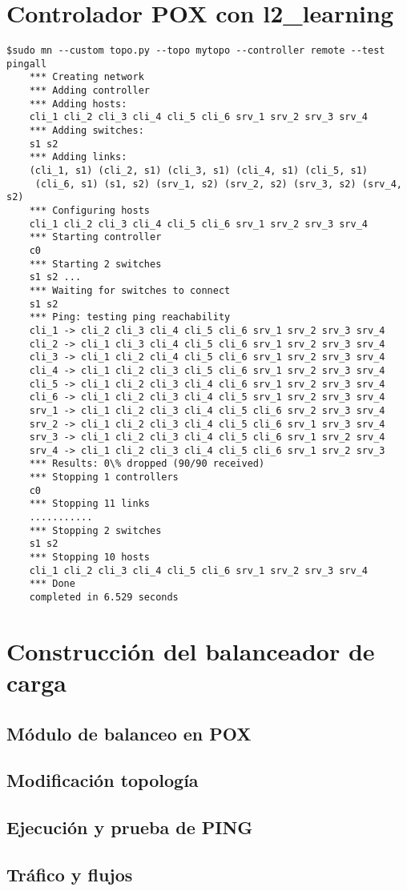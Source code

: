 \documentclass{article}
\begin{document}
\section{Controlador POX con l2\_learning}


\begin{Verbatim}[frame=single]
$sudo mn --custom topo.py --topo mytopo --controller remote --test pingall
	*** Creating network
	*** Adding controller
	*** Adding hosts:
	cli_1 cli_2 cli_3 cli_4 cli_5 cli_6 srv_1 srv_2 srv_3 srv_4
	*** Adding switches:
	s1 s2
	*** Adding links:
	(cli_1, s1) (cli_2, s1) (cli_3, s1) (cli_4, s1) (cli_5, s1)
	 (cli_6, s1) (s1, s2) (srv_1, s2) (srv_2, s2) (srv_3, s2) (srv_4, s2)
	*** Configuring hosts
	cli_1 cli_2 cli_3 cli_4 cli_5 cli_6 srv_1 srv_2 srv_3 srv_4
	*** Starting controller
	c0
	*** Starting 2 switches
	s1 s2 ...
	*** Waiting for switches to connect
	s1 s2
	*** Ping: testing ping reachability
	cli_1 -> cli_2 cli_3 cli_4 cli_5 cli_6 srv_1 srv_2 srv_3 srv_4
	cli_2 -> cli_1 cli_3 cli_4 cli_5 cli_6 srv_1 srv_2 srv_3 srv_4
	cli_3 -> cli_1 cli_2 cli_4 cli_5 cli_6 srv_1 srv_2 srv_3 srv_4
	cli_4 -> cli_1 cli_2 cli_3 cli_5 cli_6 srv_1 srv_2 srv_3 srv_4
	cli_5 -> cli_1 cli_2 cli_3 cli_4 cli_6 srv_1 srv_2 srv_3 srv_4
	cli_6 -> cli_1 cli_2 cli_3 cli_4 cli_5 srv_1 srv_2 srv_3 srv_4
	srv_1 -> cli_1 cli_2 cli_3 cli_4 cli_5 cli_6 srv_2 srv_3 srv_4
	srv_2 -> cli_1 cli_2 cli_3 cli_4 cli_5 cli_6 srv_1 srv_3 srv_4
	srv_3 -> cli_1 cli_2 cli_3 cli_4 cli_5 cli_6 srv_1 srv_2 srv_4
	srv_4 -> cli_1 cli_2 cli_3 cli_4 cli_5 cli_6 srv_1 srv_2 srv_3
	*** Results: 0\% dropped (90/90 received)
	*** Stopping 1 controllers
	c0
	*** Stopping 11 links
	...........
	*** Stopping 2 switches
	s1 s2
	*** Stopping 10 hosts
	cli_1 cli_2 cli_3 cli_4 cli_5 cli_6 srv_1 srv_2 srv_3 srv_4
	*** Done
	completed in 6.529 seconds
\end{Verbatim}

\section{Construcción del balanceador de carga}

\subsection{Módulo de balanceo en POX}

\subsection{Modificación topología}

\subsection{Ejecución y prueba de PING}

\subsection{Tráfico y flujos}


\begin{thebibliography}{99}


\end{thebibliography}
\end{document}
